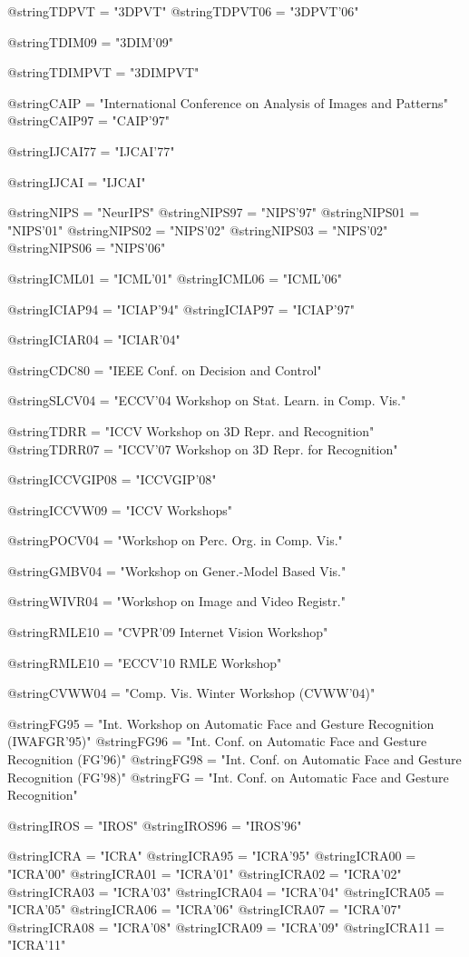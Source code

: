 @string{TDPVT = "3DPVT"}
@string{TDPVT06 = "3DPVT'06"}

@string{TDIM09 = "3DIM'09"}

@string{TDIMPVT = "3DIMPVT"}

@string{CAIP =   "International Conference on Analysis of Images
                                    and Patterns"}
@string{CAIP97 = "CAIP'97"}

@string{IJCAI77 = "IJCAI'77"}

@string{IJCAI = "IJCAI"}

@string{NIPS   = "NeurIPS"}
@string{NIPS97 = "NIPS'97"}
@string{NIPS01 = "NIPS'01"}
@string{NIPS02 = "NIPS'02"}
@string{NIPS03 = "NIPS'02"}
@string{NIPS06 = "NIPS'06"}

@string{ICML01 = "ICML'01"}
@string{ICML06 = "ICML'06"}

@string{ICIAP94 = "ICIAP'94"}
@string{ICIAP97 = "ICIAP'97"}

@string{ICIAR04 = "ICIAR'04"}

@string{CDC80 = "IEEE Conf. on Decision and Control"}

@string{SLCV04 = "ECCV'04 Workshop on Stat. Learn. in Comp. Vis."}

@string{TDRR = "ICCV Workshop on 3D Repr. and Recognition"}
@string{TDRR07 = "ICCV'07 Workshop on 3D Repr. for Recognition"}

@string{ICCVGIP08 = "ICCVGIP'08"}

@string{ICCVW09 = "ICCV Workshops"}

@string{POCV04 = "Workshop on Perc. Org. in Comp. Vis."}

@string{GMBV04 = "Workshop on Gener.-Model Based Vis."}

@string{WIVR04 = "Workshop on Image and Video Registr."}

@string{RMLE10 = "CVPR'09 Internet Vision Workshop"}

@string{RMLE10 = "ECCV'10 RMLE Workshop"}

@string{CVWW04 = "Comp. Vis. Winter Workshop (CVWW'04)"}

@string{FG95 = "Int. Workshop on Automatic Face and Gesture Recognition
(IWAFGR'95)"}
@string{FG96 = "Int. Conf. on Automatic Face and Gesture Recognition (FG'96)"}
@string{FG98 = "Int. Conf. on Automatic Face and Gesture Recognition (FG'98)"}
@string{FG = "Int. Conf. on Automatic Face and Gesture Recognition"}

@string{IROS   = "IROS"}
@string{IROS96 = "IROS'96"}

@string{ICRA   = "ICRA"}
@string{ICRA95 = "ICRA'95"}
@string{ICRA00 = "ICRA'00"}
@string{ICRA01 = "ICRA'01"}
@string{ICRA02 = "ICRA'02"}
@string{ICRA03 = "ICRA'03"}
@string{ICRA04 = "ICRA'04"}
@string{ICRA05 = "ICRA'05"}
@string{ICRA06 = "ICRA'06"}
@string{ICRA07 = "ICRA'07"}
@string{ICRA08 = "ICRA'08"}
@string{ICRA09 = "ICRA'09"}
@string{ICRA11 = "ICRA'11"}


